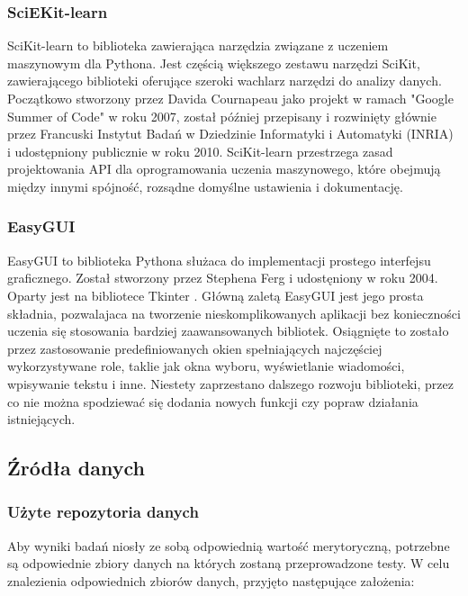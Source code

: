\documentclass[12pt,twoside]{article}
\begin{document}
\subsubsection{SciEKit-learn}

SciKit-learn to biblioteka zawierająca narzędzia związane z uczeniem maszynowym dla Pythona.
Jest częścią większego zestawu narzędzi SciKit,
zawierającego biblioteki oferujące szeroki wachlarz narzędzi do analizy danych.
Początkowo stworzony przez Davida Cournapeau jako projekt w ramach "Google Summer of Code" w roku 2007,
został później przepisany i rozwinięty głównie przez Francuski Instytut Badań w Dziedzinie Informatyki i Automatyki (INRIA)
i udostępniony publicznie w roku 2010.
SciKit-learn przestrzega zasad projektowania API dla oprogramowania uczenia maszynowego,
które obejmują między innymi spójność, rozsądne domyślne ustawienia i dokumentację. \cite{scikit}

\subsubsection{EasyGUI}

EasyGUI to biblioteka Pythona służaca do implementacji prostego interfejsu graficznego.
Został stworzony przez Stephena Ferg i udostęniony w roku 2004. Oparty jest na bibliotece Tkinter \cite{tkinter}.
Główną zaletą EasyGUI jest jego prosta składnia, pozwalajaca na tworzenie nieskomplikowanych aplikacji bez
konieczności uczenia się stosowania bardziej zaawansowanych bibliotek.
Osiągnięte to zostało przez zastosowanie predefiniowanych okien spełniających najczęściej wykorzystywane role,
taklie jak okna wyboru, wyświetlanie wiadomości, wpisywanie tekstu i inne.
Niestety zaprzestano dalszego rozwoju biblioteki, przez co nie można spodziewać się dodania nowych funkcji
czy popraw działania istniejących. \cite{easygui}

\subsection{Źródła danych}

\subsubsection{Użyte repozytoria danych}

Aby wyniki badań niosły ze sobą odpowiednią wartość merytoryczną,
potrzebne są odpowiednie zbiory danych na których zostaną przeprowadzone testy.
W celu znalezienia odpowiednich zbiorów danych, przyjęto następujące założenia:
\end{document}
